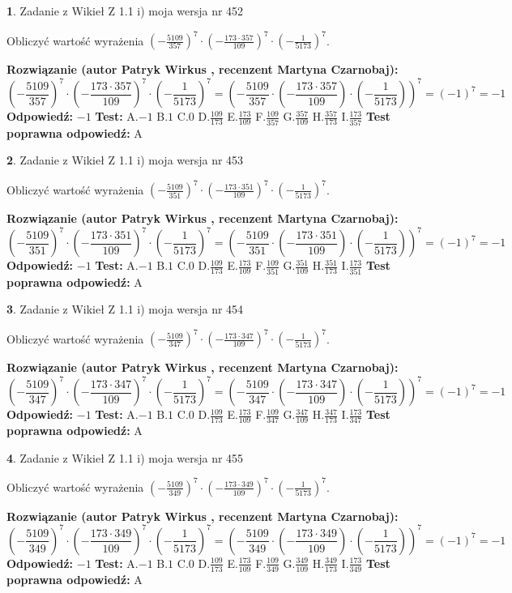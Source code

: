 \documentclass[12pt, a4paper]{article}
\theoremstyle{definition} %
\newtheorem{zad}{}
\newcommand{\zadStart}[1]{\begin{zad}#1\newline}
\newcommand{\zadStop}{\end{zad}}
\newcommand{\rozwStart}[2]{\noindent \textbf{Rozwiązanie (autor #1 , recenzent #2): }\newline}
\newcommand{\rozwStop}{\newline}
\newcommand{\odpStart}{\noindent \textbf{Odpowiedź:}\newline}
\newcommand{\odpStop}{\newline}
\newcommand{\testStart}{\noindent \textbf{Test:}\newline}
\newcommand{\testStop}{\newline}
\newcommand{\kluczStart}{\noindent \textbf{Test poprawna odpowiedź:}\newline}
\newcommand{\kluczStop}{\newline}
\begin{document}
\zadStart{Zadanie z Wikieł Z 1.1 i) moja wersja nr 452}

Obliczyć wartość wyrażenia $(-\frac{5109}{357})^{7} \cdot (-\frac{173 \cdot 357}{109})^{7} \cdot (-\frac{1}{5173})^{7}$.
\zadStop
\rozwStart{Patryk Wirkus}{Martyna Czarnobaj}
$$(-\frac{5109}{357})^{7} \cdot (-\frac{173 \cdot 357}{109})^{7} \cdot (-\frac{1}{5173})^{7} = (-\frac{5109}{357} \cdot (-\frac{173 \cdot 357}{109}) \cdot (-\frac{1}{5173}))^{7} = (-1)^{7} = -1$$
\rozwStop
\odpStart
$-1$
\odpStop
\testStart
A.$-1$ B.$1$ C.$0$ D.$\frac{109}{173}$ E.$\frac{173}{109}$
F.$\frac{109}{357}$ G.$\frac{357}{109}$
H.$\frac{357}{173}$
I.$\frac{173}{357}$
\testStop
\kluczStart
A
\kluczStop



\zadStart{Zadanie z Wikieł Z 1.1 i) moja wersja nr 453}

Obliczyć wartość wyrażenia $(-\frac{5109}{351})^{7} \cdot (-\frac{173 \cdot 351}{109})^{7} \cdot (-\frac{1}{5173})^{7}$.
\zadStop
\rozwStart{Patryk Wirkus}{Martyna Czarnobaj}
$$(-\frac{5109}{351})^{7} \cdot (-\frac{173 \cdot 351}{109})^{7} \cdot (-\frac{1}{5173})^{7} = (-\frac{5109}{351} \cdot (-\frac{173 \cdot 351}{109}) \cdot (-\frac{1}{5173}))^{7} = (-1)^{7} = -1$$
\rozwStop
\odpStart
$-1$
\odpStop
\testStart
A.$-1$ B.$1$ C.$0$ D.$\frac{109}{173}$ E.$\frac{173}{109}$
F.$\frac{109}{351}$ G.$\frac{351}{109}$
H.$\frac{351}{173}$
I.$\frac{173}{351}$
\testStop
\kluczStart
A
\kluczStop



\zadStart{Zadanie z Wikieł Z 1.1 i) moja wersja nr 454}

Obliczyć wartość wyrażenia $(-\frac{5109}{347})^{7} \cdot (-\frac{173 \cdot 347}{109})^{7} \cdot (-\frac{1}{5173})^{7}$.
\zadStop
\rozwStart{Patryk Wirkus}{Martyna Czarnobaj}
$$(-\frac{5109}{347})^{7} \cdot (-\frac{173 \cdot 347}{109})^{7} \cdot (-\frac{1}{5173})^{7} = (-\frac{5109}{347} \cdot (-\frac{173 \cdot 347}{109}) \cdot (-\frac{1}{5173}))^{7} = (-1)^{7} = -1$$
\rozwStop
\odpStart
$-1$
\odpStop
\testStart
A.$-1$ B.$1$ C.$0$ D.$\frac{109}{173}$ E.$\frac{173}{109}$
F.$\frac{109}{347}$ G.$\frac{347}{109}$
H.$\frac{347}{173}$
I.$\frac{173}{347}$
\testStop
\kluczStart
A
\kluczStop



\zadStart{Zadanie z Wikieł Z 1.1 i) moja wersja nr 455}

Obliczyć wartość wyrażenia $(-\frac{5109}{349})^{7} \cdot (-\frac{173 \cdot 349}{109})^{7} \cdot (-\frac{1}{5173})^{7}$.
\zadStop
\rozwStart{Patryk Wirkus}{Martyna Czarnobaj}
$$(-\frac{5109}{349})^{7} \cdot (-\frac{173 \cdot 349}{109})^{7} \cdot (-\frac{1}{5173})^{7} = (-\frac{5109}{349} \cdot (-\frac{173 \cdot 349}{109}) \cdot (-\frac{1}{5173}))^{7} = (-1)^{7} = -1$$
\rozwStop
\odpStart
$-1$
\odpStop
\testStart
A.$-1$ B.$1$ C.$0$ D.$\frac{109}{173}$ E.$\frac{173}{109}$
F.$\frac{109}{349}$ G.$\frac{349}{109}$
H.$\frac{349}{173}$
I.$\frac{173}{349}$
\testStop
\kluczStart
A
\kluczStop
\end{document}
